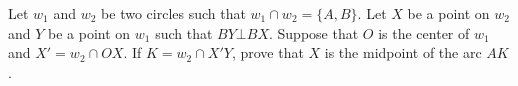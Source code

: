 Let $w_1$ and $w_2$ be two circles such that $ w_1 \cap w_2 = \{ A,B\}$. Let $X$ be a point on $w_2$ and $Y$ be a point on $w_1$ such that $BY \bot BX$. Suppose that $O$ is the center of $w_1$ and $X' = w_2 \cap OX$. If $ K = w_2 \cap X'Y $, prove that $ X $ is the midpoint of the arc $AK$.

